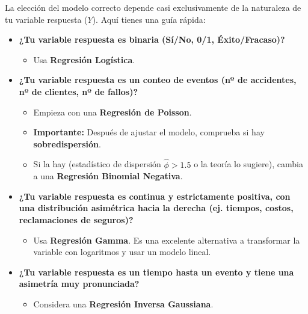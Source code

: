 \documentclass[
  letterpaper,
  DIV=11,
  numbers=noendperiod]{scrreprt}
\providecommand{\tightlist}{%
  \setlength{\itemsep}{0pt}\setlength{\parskip}{0pt}}
\begin{document}
\begin{tcolorbox}[enhanced jigsaw, breakable, toprule=.15mm, bottomtitle=1mm, coltitle=black, colbacktitle=quarto-callout-warning-color!10!white, titlerule=0mm, opacitybacktitle=0.6, bottomrule=.15mm, toptitle=1mm, title=\textcolor{quarto-callout-warning-color}{\faExclamationTriangle}\hspace{0.5em}{¿Qué GLM debo usar?}, arc=.35mm, rightrule=.15mm, opacityback=0, colframe=quarto-callout-warning-color-frame, leftrule=.75mm, left=2mm, colback=white]

La elección del modelo correcto depende casi exclusivamente de la
naturaleza de tu variable respuesta (\(Y\)). Aquí tienes una guía
rápida:

\begin{itemize}
\tightlist
\item
  \textbf{¿Tu variable respuesta es binaria (Sí/No, 0/1,
  Éxito/Fracaso)?}

  \begin{itemize}
  \tightlist
  \item
    Usa \textbf{Regresión Logística}.
  \end{itemize}
\item
  \textbf{¿Tu variable respuesta es un conteo de eventos (nº de
  accidentes, nº de clientes, nº de fallos)?}

  \begin{itemize}
  \tightlist
  \item
    Empieza con una \textbf{Regresión de Poisson}.
  \item
    \textbf{Importante:} Después de ajustar el modelo, comprueba si hay
    \textbf{sobredispersión}.
  \item
    Si la hay (estadístico de dispersión \(\hat{\phi} > 1.5\) o la
    teoría lo sugiere), cambia a una \textbf{Regresión Binomial
    Negativa}.
  \end{itemize}
\item
  \textbf{¿Tu variable respuesta es continua y estrictamente positiva,
  con una distribución asimétrica hacia la derecha (ej. tiempos, costos,
  reclamaciones de seguros)?}

  \begin{itemize}
  \tightlist
  \item
    Usa \textbf{Regresión Gamma}. Es una excelente alternativa a
    transformar la variable con logaritmos y usar un modelo lineal.
  \end{itemize}
\item
  \textbf{¿Tu variable respuesta es un tiempo hasta un evento y tiene
  una asimetría muy pronunciada?}

  \begin{itemize}
  \tightlist
  \item
    Considera una \textbf{Regresión Inversa Gaussiana}.
  \end{itemize}
\end{itemize}

\end{tcolorbox}
\end{document}
